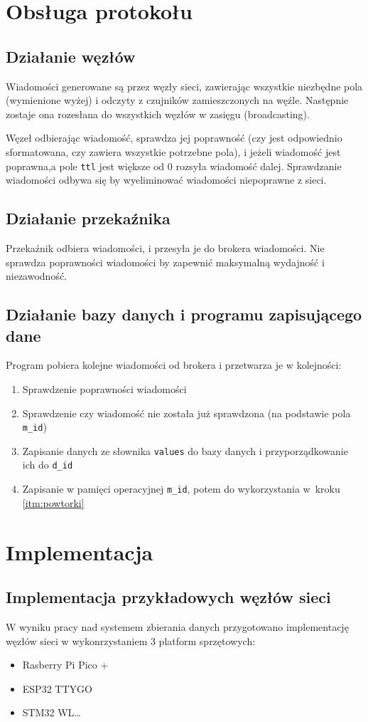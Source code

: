 \section{Obsługa protokołu}

\subsection{Działanie węzłów}
Wiadomości generowane są przez węzły sieci, zawierając wszystkie niezbędne pola (wymienione wyżej) i odczyty z czujników zamieszczonych na węźle. Następnie zostaje ona rozesłana do wszystkich węzłów w zasięgu (broadcasting).

Węzeł odbierając wiadomość, sprawdza jej poprawność (czy jest odpowiednio sformatowana, czy zawiera wszystkie potrzebne pola), i jeżeli wiadomość jest poprawna,a pole \texttt{ttl} jest większe od 0 rozsyła wiadomość dalej.
Sprawdzanie wiadomości odbywa się by wyeliminować wiadomości niepoprawne z sieci.


\subsection{Działanie przekaźnika}
Przekaźnik odbiera wiadomości, i przesyła je do brokera wiadomości. Nie sprawdza poprawności wiadomości by zapewnić maksymalną wydajność i niezawodność.

\subsection{Działanie bazy danych i programu zapisującego dane}
Program pobiera kolejne wiadomości od brokera i przetwarza je w kolejności:
\begin{enumerate}
    \item Sprawdzenie poprawności wiadomości
    \item \label{itm:powtorki} Sprawdzenie czy wiadomość nie została już sprawdzona (na podstawie pola \texttt{m\_id})
    \item Zapisanie danych ze słownika \texttt{values} do bazy danych i przyporządkowanie ich do \texttt{d\_id}
    \item Zapisanie w pamięci operacyjnej \texttt{m\_id}, potem do wykorzystania w~kroku \ref{itm:powtorki}
\end{enumerate}

\section{Implementacja}
\subsection{Implementacja przykładowych węzłów sieci}
W wyniku pracy nad systemem zbierania danych przygotowano implementację węzłów sieci w wykonrzystaniem 3 platform sprzętowych:
\begin{itemize}
    \item Rasberry Pi Pico +
    \item ESP32 TTYGO
    \item STM32 WL\dots
\end{itemize}
